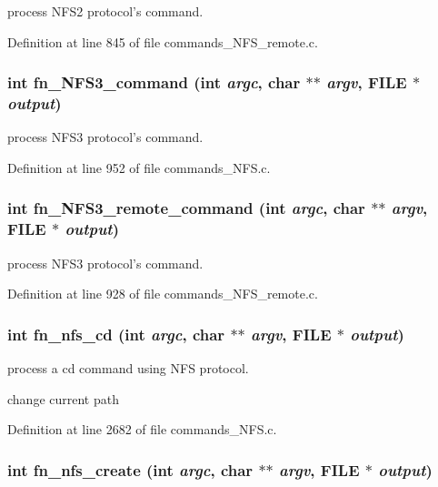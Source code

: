 process NFS2 protocol's command. 

Definition at line 845 of file commands\_\-NFS\_\-remote.c.
\subsubsection[{fn\_\-NFS3\_\-command}]{\setlength{\rightskip}{0pt plus 5cm}int fn\_\-NFS3\_\-command (int {\em argc}, \/  char $\ast$$\ast$ {\em argv}, \/  FILE $\ast$ {\em output})}\label{commands_8h_07e03c4595dc082f2a667e25574e2d90}


process NFS3 protocol's command. 

Definition at line 952 of file commands\_\-NFS.c.
\subsubsection[{fn\_\-NFS3\_\-remote\_\-command}]{\setlength{\rightskip}{0pt plus 5cm}int fn\_\-NFS3\_\-remote\_\-command (int {\em argc}, \/  char $\ast$$\ast$ {\em argv}, \/  FILE $\ast$ {\em output})}\label{commands_8h_ccf667520f77b36c51d5d17bf8938c28}


process NFS3 protocol's command. 

Definition at line 928 of file commands\_\-NFS\_\-remote.c.
\subsubsection[{fn\_\-nfs\_\-cd}]{\setlength{\rightskip}{0pt plus 5cm}int fn\_\-nfs\_\-cd (int {\em argc}, \/  char $\ast$$\ast$ {\em argv}, \/  FILE $\ast$ {\em output})}\label{commands_8h_0d725e646fab51fc0eb5560df33bc1a0}


process a cd command using NFS protocol.

change current path 

Definition at line 2682 of file commands\_\-NFS.c.
\subsubsection[{fn\_\-nfs\_\-create}]{\setlength{\rightskip}{0pt plus 5cm}int fn\_\-nfs\_\-create (int {\em argc}, \/  char $\ast$$\ast$ {\em argv}, \/  FILE $\ast$ {\em output})}\label{commands_8h_2afba74460f41057660fe0e4837af49f}


